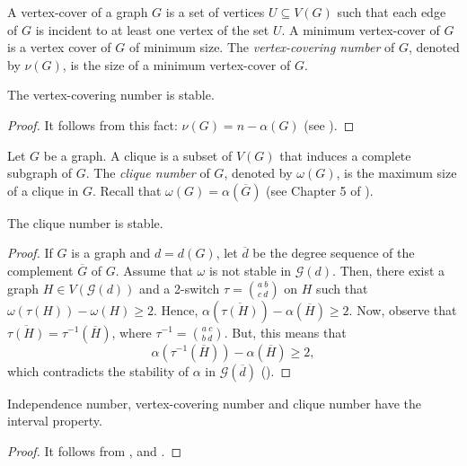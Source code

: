 \documentclass{BICA}
\begin{document}
A vertex-cover of a graph $G$ is a set of vertices $U\subseteq V(G)$ such that each edge of $G$ is incident to at least one vertex of the set $U$. A minimum vertex-cover of $G$ is a vertex cover of $G$ of minimum size. The \emph{vertex-covering number} of $G$, denoted by $\nu(G)$, is the size of a minimum vertex-cover of $G$.

\begin{corollary}
	\label{vertex_cover_stable}
	The vertex-covering number is stable.
\end{corollary}

\begin{proof}
	It follows from this fact: $\nu(G)=n-\alpha(G)$ (see \cite{Gallai}).
\end{proof}

Let $G$ be a graph. A clique is a subset of $V(G)$ that induces a complete subgraph of $G$. The \emph{clique number} of $G$, denoted by $\omega(G)$, is the maximum size of a clique in $G$. Recall that $\omega(G)=\alpha(\overline{G})$ (see Chapter 5 of \cite{Diestel2005}).

\begin{theorem}
	\label{clique_stable}
	The clique number is stable.
\end{theorem}
\begin{proof}
	If $G$ is a graph and $d=d(G)$, let $\overline{d}$ be the degree sequence of the complement $\overline{G}$ of $G$. Assume that $\omega$ is not stable in $\mathcal{G}(d)$. Then, there exist a graph $H\in V(\mathcal{G}(d))$ and a 2-switch $\tau={{a \ b}\choose{c \ d}}$ on $H$ such that $\omega(\tau(H))-\omega(H)\geq 2$. Hence, $\alpha(\overline{\tau(H)})-\alpha(\overline{H})\geq 2$. Now, observe that $\overline{\tau(H)}=\tau^{-1}(\overline{H})$, where $\tau^{-1}={{a \ c}\choose{b \ d}}$. But, this means that
	\[ \alpha(\tau^{-1}(\overline{H}))-\alpha(\overline{H})\geq 2, \]
	which contradicts the stability of $\alpha$ in $\mathcal{G}(\overline{d})$ ().
\end{proof}

\begin{theorem}
	Independence number, vertex-covering number and clique number have the interval property.
\end{theorem}

\begin{proof}
	It follows from , and .
\end{proof}
\end{document}
